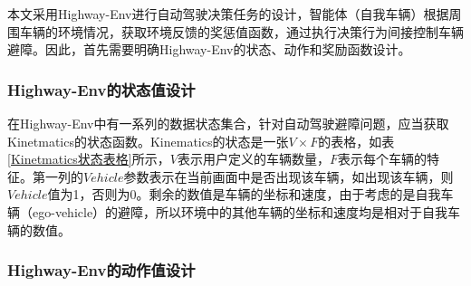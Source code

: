 本文采用Highway-Env进行自动驾驶决策任务的设计，智能体（自我车辆）根据周围车辆的环境情况，获取环境反馈的奖惩值函数，通过执行决策行为间接控制车辆避障。因此，首先需要明确Highway-Env的状态、动作和奖励函数设计。

\subsubsection{Highway-Env的状态值设计}

在Highway-Env中有一系列的数据状态集合，针对自动驾驶避障问题，应当获取Kinetmatics的状态函数。Kinematics的状态是一张$V \times F$的表格，如表\ref{Kinetmatics状态表格}所示，$V$表示用户定义的车辆数量，$F$表示每个车辆的特征。第一列的$Vehicle$参数表示在当前画面中是否出现该车辆，如出现该车辆，则$Vehicle$值为1，否则为0。剩余的数值是车辆的坐标和速度，由于考虑的是自我车辆（ego-vehicle）的避障，所以环境中的其他车辆的坐标和速度均是相对于自我车辆的数值。

\begin{table}[htbp]
    \vspace{13pt} %
    \caption{Kinetmatics状态表格}\label{Kinetmatics状态表格}
    \centering
    \renewcommand\arraystretch{1.5}
\end{table}

\subsubsection{Highway-Env的动作值设计}

